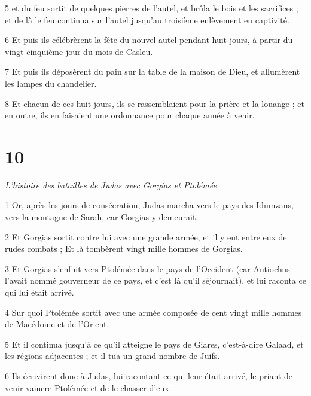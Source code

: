 \par 5 et du feu sortit de quelques pierres de l'autel, et brûla le bois et les sacrifices ; et de là le feu continua sur l'autel jusqu'au troisième enlèvement en captivité.

\par 6 Et puis ils célébrèrent la fête du nouvel autel pendant huit jours, à partir du vingt-cinquième jour du mois de Casleu.

\par 7 Et puis ils déposèrent du pain sur la table de la maison de Dieu, et allumèrent les lampes du chandelier.

\par 8 Et chacun de ces huit jours, ils se rassemblaient pour la prière et la louange ; et en outre, ils en faisaient une ordonnance pour chaque année à venir.

\chapter{10}

\par \textit{L'histoire des batailles de Judas avec Gorgias et Ptolémée}

\par 1 Or, après les jours de consécration, Judas marcha vers le pays des Idumzans, vers la montagne de Sarah, car Gorgias y demeurait.

\par 2 Et Gorgias sortit contre lui avec une grande armée, et il y eut entre eux de rudes combats ; Et là tombèrent vingt mille hommes de Gorgias.

\par 3 Et Gorgias s'enfuit vers Ptolémée dans le pays de l'Occident (car Antiochus l'avait nommé gouverneur de ce pays, et c'est là qu'il séjournait), et lui raconta ce qui lui était arrivé.

\par 4 Sur quoi Ptolémée sortit avec une armée composée de cent vingt mille hommes de Macédoine et de l'Orient.

\par 5 Et il continua jusqu'à ce qu'il atteigne le pays de Giares, c'est-à-dire Galaad, et les régions adjacentes ; et il tua un grand nombre de Juifs.

\par 6 Ils écrivirent donc à Judas, lui racontant ce qui leur était arrivé, le priant de venir vaincre Ptolémée et de le chasser d'eux.

